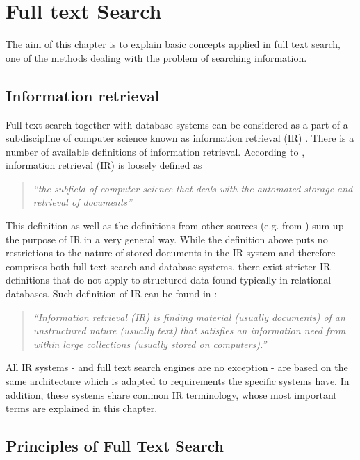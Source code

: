 \chapter{Full text Search}

The aim of this chapter is to explain basic concepts applied in full
text search, one of the methods dealing with the problem of searching information.

\section{Information retrieval}

Full text search together with database systems can be considered  as a part of a subdiscipline of computer science known
as information retrieval (IR) \cite{Witten:1999:MGC:323905}.
There is a number of available definitions of information retrieval.
According to \cite{IRDataAlgorithms}, information
retrieval (IR) is loosely defined as

	\begin{quote}
		\textsl{``the subfield of computer science
	that deals with the automated storage and retrieval of documents''}
	\end{quote}

This definition as well as the definitions from other sources (e.g. from \cite{Witten:1999:MGC:323905}) sum up the purpose of IR in a very general way.
While the definition above puts no restrictions to the nature of stored documents in the IR system and therefore comprises both full text search and database systems, there exist stricter IR definitions that do not apply to structured data found typically in relational databases. 
Such definition of IR can be found in \cite{ManningRaghavanSchuetze08}:

	\begin{quote}
		\textsl{``Information retrieval (IR) is finding material (usually documents) of an unstructured nature (usually  text) that satisfies an information need from within large collections (usually stored on computers).''}
	\end{quote}

All IR systems - and full text search engines are no exception - are based on the same architecture which is adapted to requirements the specific systems have. In addition, these systems share common IR terminology, whose most important terms are explained in this chapter.

\section{Principles of Full Text Search}

